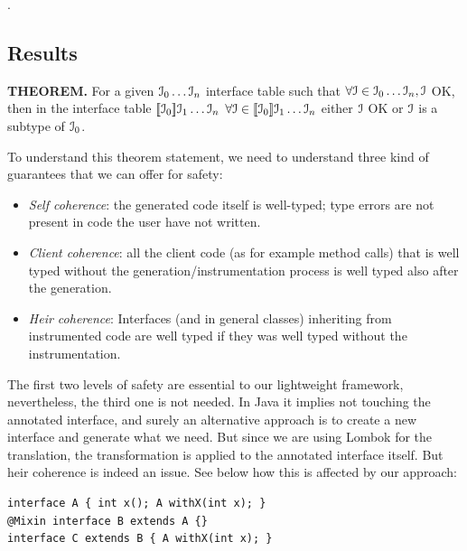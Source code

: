 .




\subsection{Results}
\textbf{THEOREM. }
For a given ${\cal{I}}_0\ldots{\cal{I}}_n$ interface table such that
$\forall{\cal{I}}\in{\cal{I}}_0\ldots{\cal{I}}_n, {\cal{I}}$ OK, then in the interface table
$[\![{\cal{I}}_0]\!]{\cal{I}}_1\ldots{\cal{I}}_n$
$\forall{\cal{I}}\in[\![{\cal{I}}_0]\!]{\cal{I}}_1\ldots{\cal{I}}_n$ either ${\cal{I}}$ OK or ${\cal{I}}$ is a subtype of ${\cal{I}}_0$.


To understand this theorem statement, we need to understand three kind of guarantees that we can offer for safety:
\begin{itemize}
\item \textit{Self coherence}: the generated code itself is well-typed; type errors are not present in code the user have not written.
\item \textit{Client coherence}: all the client code (as for example method calls) that is well typed without the generation/instrumentation process is well typed also after the generation.
\item \textit{Heir coherence}: Interfaces (and in general classes) inheriting from instrumented code are well typed if they was well typed without the instrumentation.
\end{itemize}
The first two levels of safety are essential to our lightweight framework, nevertheless, the third one is not needed. In Java it implies not touching the annotated interface, and surely an alternative approach is to create a new interface and generate what we need. But since we are using Lombok for the translation, the transformation is applied to the annotated interface itself. But heir coherence is indeed an issue. See below how this is affected by our approach:

\begin{lstlisting}
interface A { int x(); A withX(int x); }
@Mixin interface B extends A {}
interface C extends B { A withX(int x); }
\end{lstlisting}

